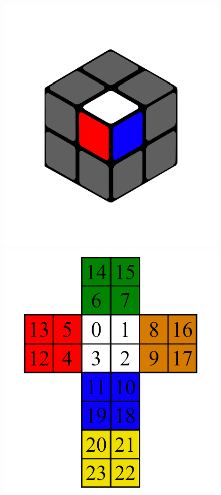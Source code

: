 \documentclass[12pt,a4paper, usenames, dvipsnames]{scrartcl}
\begin{document}
\begin{figure}[h]
\includegraphics[scale=0.085]{2x2stein.png} \\
\includegraphics[scale=0.1]{2x2foldedout.png}

\end{figure}
\end{document}

